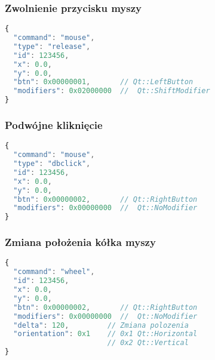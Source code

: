 \subsubsection{Zwolnienie przycisku myszy}
\begin{lstlisting}[language=JavaScript,numbers=none]
{
  "command": "mouse",
  "type": "release",
  "id": 123456,
  "x": 0.0,
  "y": 0.0,
  "btn": 0x00000001,       // Qt::LeftButton
  "modifiers": 0x02000000  //  Qt::ShiftModifier
}
\end{lstlisting}

\subsubsection{Podwójne kliknięcie}
\begin{lstlisting}[language=JavaScript,numbers=none]
{
  "command": "mouse",
  "type": "dbclick",
  "id": 123456,
  "x": 0.0,
  "y": 0.0,
  "btn": 0x00000002,       // Qt::RightButton
  "modifiers": 0x00000000  //  Qt::NoModifier
}
\end{lstlisting}

\subsubsection{Zmiana położenia kółka myszy}
\begin{lstlisting}[language=JavaScript,numbers=none]
{
  "command": "wheel",
  "id": 123456,
  "x": 0.0,
  "y": 0.0,
  "btn": 0x00000002,       // Qt::RightButton
  "modifiers": 0x00000000  //  Qt::NoModifier
  "delta": 120,         // Zmiana polozenia
  "orientation": 0x1    // 0x1 Qt::Horizontal
                        // 0x2 Qt::Vertical
}
\end{lstlisting} 